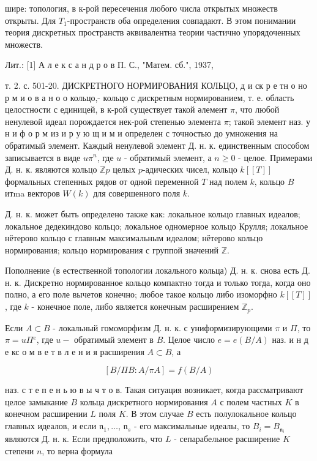 \documentclass[10pt]{article}
\begin{document}
шире: топология, в к-рой пересечения любого числа открытых множеств открыты. Для $T_{1}$-пространств оба определения совпадают. В этом понимании теория дискретных пространств әквивалентна теории частично упорядоченных множеств.



Лит.: [1] А л е к с а н д р о в П. С., "Матем. сб.", 1937,

т. 2. с. 501-20. ДИСКРЕТНОГО НОРМИРОВАНИЯ КОЛЬЦО, д и ск р е тн о но р м и о в а н о о кольцо,- кольцо с дискретным нормированием, т. е. область целостности с единицей, в к-рой существует такой әлемент $\pi$, что любой ненулевой идеал порождается нек-рой степенью элемента $\pi$; такой элемент наз. у н и ф о р м из и р у ю щ и м и определен с точностью до умножения на обратимый элемент. Каждый ненулевой элемент Д. н. к. единственным способом записывается в виде $u \pi^{n}$, где $u$ - обратимый элемент, а $n \geqslant 0$ - целое. Примерами Д. н. к. являются кольцо $\mathbb{Z} p$ целых $p$-адических чисел, кольцо $k[[T]]$ формальных степенных рядов от одной переменной $T$ над полем $k$, кольцо $B$ итma векторов $W(k)$ для совершенного поля $k$.



Д. н. к. может быть определено также как: локальное кольцо главных идеалов; локальное дедекиндово кольцо; локальное одномерное кольцо Крулля; локальное нётерово кольцо с главным максимальным идеалом; нётерово кольцо нормирования; кольцо нормирования с группой значений $\mathbb{Z}$.



Пополнение (в естественной топологии локального кольца) Д. н. к. снова есть Д. н. к. Дискретно нормированное кольцо компактно тогда и только тогда, когда оно полно, а его поле вычетов конечно; любое такое кольцо либо изоморфно $k[[T]]$, где $k$ - конечное поле, либо является конечным расширением $\mathbb{Z}_{p}$.



Если $A \subset B$ - локальный гомоморфизм Д. н. к. с униформизирующими $\pi$ и $\Pi$, то $\pi=u \Pi{ }^{e}$, где $u-$ обратимый элемент в $B$. Целое число $e=e(B / A)$ наз. и н д е кс о м в е т в л е н и я расширения $A \subset B$, а



\[

[B / \Pi B: A / \pi A]=f(B / A)

\]



наз. с т е п е н ь ю в ы ч т о в. Такая ситуация возникает, когда рассматривают целое замыкание $B$ кольца дискретного нормирования $A$ с полем частных $K$ в конечном расширении $L$ поля $K$. В этом случае $B$ есть полулокальное кольцо главных идеалов, и если $\mathfrak{n}_{1}, \ldots$, $\mathfrak{n}_{s}$ - его максимальные идеалы, то $B_{i}=B_{\mathfrak{n}_{i}}$ являются Д. н. к. Если предположить, что $L$ - сепарабельное расширение $K$ степени $n$, то верна формула
\end{document}
